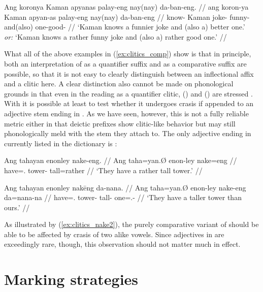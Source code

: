 \a\label{ex:clitics_comp3}\begingl
	\gla Ang koronya Kaman apyanas palay-eng nay(nay) da-ban-eng. //
	\glb ang koron-ya Kaman apyan-as palay-eng nay(nay) da-ban-eng //
	\glc \AgtT{} know-\TsgM{} Kaman joke-\Parg{} funny-\Comp{} 
		and(\til{}also) one-good-\Comp{} //
	\glft `Kaman knows a funnier joke and (also a) better one.' \\
		\textit{or:} `Kaman knows a rather funny joke and (also a) rather good 
		one.' //
\endgl
\xe

What all of the above examples in (\ref{ex:clitics_comp}) show is that in
principle, both an interpretation of  as a quantifier suffix
and as a comparative suffix are possible, so that it is not easy to clearly
distinguish between an inflectional affix and a clitic here. A clear
distinction also cannot be made on phonological grounds in that even in the
reading as a quantifier clitic,  (\Comp{}) and
 (\Supl{}) are stressed 
\parencite[compare][90--92]{spencerluis2012}. With  it is
possible at least to test whether it undergoes crasis if appended to an
adjective stem ending in . As we have seen, however, this is not a
fully reliable metric either in that deictic prefixes show clitic-like behavior
but may still phonologically meld with the stem they attach to. The only
adjective ending in  currently listed in the dictionary is 
:

\pex\label{ex:clitics_nake}
\a\label{ex:clitics_nake1}\begingl
	\gla Ang tahayan enonley nake-eng. //
	\glb Ang taha=yan.Ø enon-ley nake=eng //
	\glc \Aarg{} have=\TplM{}.\Top{} tower-\PargI{} tall=rather //
	\glft `They have a rather tall tower.' //
\endgl

\a\label{ex:clitics_nake2}\begingl
	\gla Ang tahayan enonley nakēng da-nana. //
	\glb Ang taha=yan.Ø enon-ley nake-eng da=nana-na //
	\glc \Aarg{} have=\TplM{}.\Top{} tower-\PargI{} tall-\Comp{}
		one=\Fpl{}.\Gen{}-\Gen{} //
	\glft `They have a taller tower than ours.' //
\endgl
\xe

As illustrated by (\ref{ex:clitics_nake2}), the purely comparative variant of
 should be able to be affected by crasis of two alike vowels.
Since adjectives in  are exceedingly rare, though, this
observation should not matter much in effect.


\section{Marking strategies}
\label{sec:markstrat}

